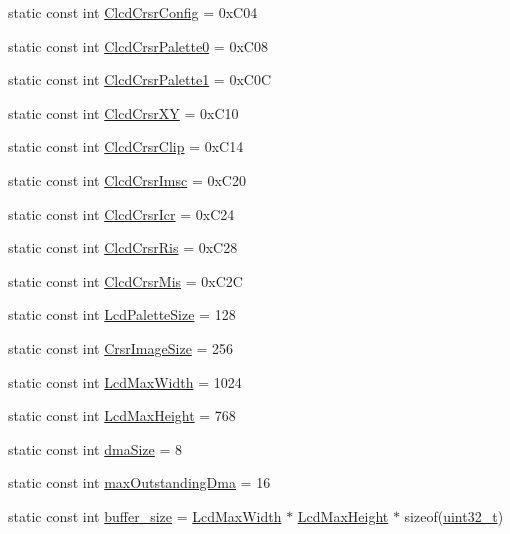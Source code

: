 \begin{DoxyCompactItemize}
\item 
static const int \hyperlink{classPl111_af3d614306a1e372b77b025635dbc46e2}{ClcdCrsrConfig} = 0xC04
\item 
static const int \hyperlink{classPl111_a117f2a62438a22f2087b12f5c4863d7a}{ClcdCrsrPalette0} = 0xC08
\item 
static const int \hyperlink{classPl111_aa357b0e8940dad7feaa2084a10f20e9a}{ClcdCrsrPalette1} = 0xC0C
\item 
static const int \hyperlink{classPl111_a8d4bbe591a2f5a1e4ec7123e2bd5b6d0}{ClcdCrsrXY} = 0xC10
\item 
static const int \hyperlink{classPl111_ad3ec0e054ab4011d614f776623c6a497}{ClcdCrsrClip} = 0xC14
\item 
static const int \hyperlink{classPl111_a27c46cba741564bc72503f43526be52b}{ClcdCrsrImsc} = 0xC20
\item 
static const int \hyperlink{classPl111_a1fb557456a3039ce3d0491fe253bfaa6}{ClcdCrsrIcr} = 0xC24
\item 
static const int \hyperlink{classPl111_acc89af7644d93d9abef747b1980cb90d}{ClcdCrsrRis} = 0xC28
\item 
static const int \hyperlink{classPl111_a9f080f65498dfff9662cba2f7b2aaac6}{ClcdCrsrMis} = 0xC2C
\item 
static const int \hyperlink{classPl111_a12008db88a2d42b82d27aa2de179af45}{LcdPaletteSize} = 128
\item 
static const int \hyperlink{classPl111_aa41c0581029a0907bf48839070059c66}{CrsrImageSize} = 256
\item 
static const int \hyperlink{classPl111_a362d9422fca0ce265b4c2059d8cca61e}{LcdMaxWidth} = 1024
\item 
static const int \hyperlink{classPl111_a073c8ffbeb968df8b883f5426cf74e4f}{LcdMaxHeight} = 768
\item 
static const int \hyperlink{classPl111_a994e38c05b2540d39ba38c10de8ee688}{dmaSize} = 8
\item 
static const int \hyperlink{classPl111_a70cf4507219804689529791b7f293efe}{maxOutstandingDma} = 16
\item 
static const int \hyperlink{classPl111_a9bd822a4ae927624f7827c898422d1db}{buffer\_\-size} = \hyperlink{classPl111_a362d9422fca0ce265b4c2059d8cca61e}{LcdMaxWidth} $\ast$ \hyperlink{classPl111_a073c8ffbeb968df8b883f5426cf74e4f}{LcdMaxHeight} $\ast$ sizeof(\hyperlink{Type_8hh_a435d1572bf3f880d55459d9805097f62}{uint32\_\-t})
\end{DoxyCompactItemize}


